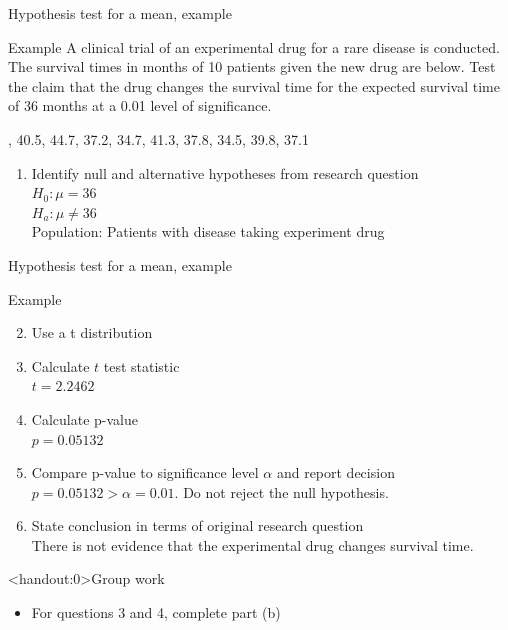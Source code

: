 \documentclass[xcolor=table, handout]{beamer}
\begin{document}
\begin{frame}{Hypothesis test for a mean, example}
\begin{exampleblock}{Example}
\large
A clinical trial of an experimental drug for a rare disease is conducted. The survival times in months of 10 patients given the new drug are below. Test the claim that the drug changes the survival time for the expected survival time of 36 months at a 0.01 level of significance.\\
\medskip
{, 40.5, 44.7, 37.2, 34.7, 41.3, 37.8, 34.5, 39.8, 37.1
\par}
\begin{enumerate}
\pause\item Identify null and alternative hypotheses from research question\\
\pause$H_0: \mu = 36$\\
$H_a: \mu \ne 36$\\
Population: Patients with disease taking experiment drug
\end{enumerate}
\end{exampleblock}
\end{frame}

\begin{frame}{Hypothesis test for a mean, example}
\begin{exampleblock}{Example}
\large
\begin{enumerate}
\setcounter{enumi}{1}

\item Use a t distribution
\pause\item Calculate $t$ test statistic\\
\pause$t=2.2462$
\pause\item Calculate p-value\\
\pause$p = 0.05132$
\pause\item Compare p-value to significance level $\alpha$ and report decision\\
\pause$p = 0.05132 > \alpha = 0.01$. Do not reject the null hypothesis.
\pause\item State conclusion in terms of original research question\\
\pause There is not evidence that the experimental drug changes survival time.
\end{enumerate}

\end{exampleblock}
\end{frame}

\begin{frame}<handout:0>{Group work}
\begin{block}{}
\large
\begin{itemize}
\item For questions 3 and 4, complete part (b)
\end{itemize}
\end{block}
\end{frame}
\end{document}
